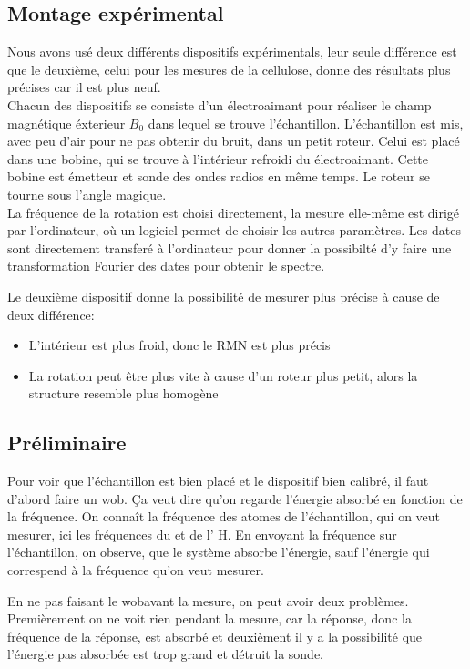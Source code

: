 \documentclass[a4paper,12pt]{scrartcl}
\begin{document}
  \subsection{Montage expérimental}
   Nous avons usé deux différents dispositifs expérimentals, leur seule différence est que le deuxième,  celui pour les mesures de la cellulose, donne des résultats plus précises car il est plus neuf.\\
   Chacun des dispositifs se consiste d'un électroaimant pour réaliser le champ magnétique éxterieur $B_0$ dans lequel se trouve l'échantillon. L'échantillon est mis, avec peu d'air pour ne pas obtenir du bruit, dans un petit roteur. Celui est placé dans une bobine, qui se trouve à l'intérieur refroidi du électroaimant. Cette bobine est émetteur et sonde des ondes radios en même temps. Le roteur se tourne sous l'angle magique. \\
   La fréquence de la rotation est choisi directement, la mesure elle-même est dirigé par l'ordinateur, où un logiciel permet de choisir les autres paramètres. Les dates sont directement transferé à l'ordinateur pour donner la possibilté d'y faire une transformation Fourier des dates pour obtenir le spectre.

   Le deuxième dispositif donne la possibilité de mesurer plus précise à cause de deux différence:
   \begin{itemize}
    \item L'intérieur est plus froid, donc le RMN est plus précis
    \item La rotation peut être plus vite à cause d'un roteur plus petit, alors la structure resemble plus homogène
   \end{itemize}


  \subsection{Préliminaire} 
   Pour voir que l'échantillon est bien placé et le dispositif bien calibré, il faut d'abord faire un \flqq wob\frqq. \c Ca veut dire qu'on regarde l'énergie absorbé en fonction de la fréquence. On connaît la fréquence des atomes de l'échantillon, qui on veut mesurer, ici les fréquences du  et de l' H. En envoyant la fréquence sur l'échantillon, on observe, que le système absorbe l'énergie, sauf l'énergie qui correspend à la fréquence qu'on veut mesurer. 

   En ne pas faisant le \flqq wob\frqq avant la mesure, on peut avoir deux problèmes. Premièrement on ne voit rien pendant la mesure, car la réponse, donc la fréquence de la réponse, est absorbé et deuxièment il y a la possibilité que l'énergie pas absorbée est trop grand et détruit la sonde.
\end{document}
